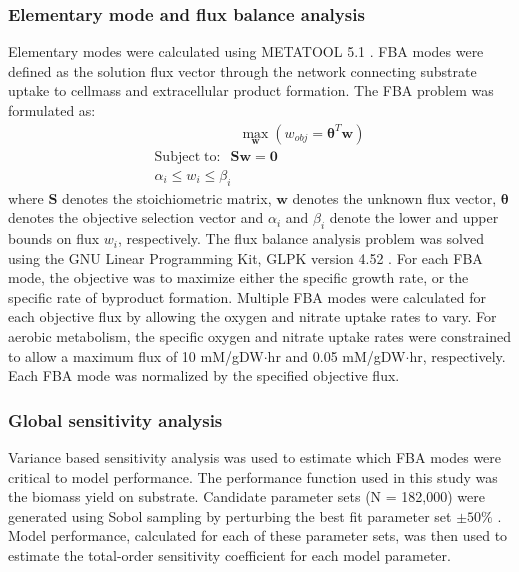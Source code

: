 \documentclass[10pt,twocolumn,twoside,final]{IEEEtran}
\begin{document}
\noindent\subsubsection*{Elementary mode and flux balance analysis}
Elementary modes were calculated using METATOOL 5.1 \cite{2006_vonKamp_Metatool}.
FBA modes were defined as the solution flux vector through the network connecting substrate uptake to cellmass and extracellular product formation.
The FBA problem was formulated as:
\begin{equation}
 \begin{multlined}
	\qquad \qquad \qquad \max_{\boldsymbol{w}}{} \! \left( w_{obj} = \mathbf{\theta}^T \boldsymbol{w} \right) \\
	\mathrm{Subject \; to:}
	 \; \; \mathbf{S}\mathbf{w}=\mathbf{0} \\
\alpha_i \leq w_i \leq \beta_i  \qquad
 \end{multlined}
\end{equation}
where $\mathbf{S}$ denotes the stoichiometric matrix, $\mathbf{w}$ denotes the unknown flux vector, $\boldsymbol{\theta}$ denotes the objective selection vector
and $\alpha_i$ and $\beta_i$ denote the lower and upper bounds on flux $w_{i}$, respectively.
The flux balance analysis problem was solved using the GNU Linear Programming Kit, GLPK version 4.52 \cite{GLPK}.
For each FBA mode, the objective was to maximize either the specific growth rate, or the specific rate of byproduct formation.
Multiple FBA modes were calculated for each objective flux by allowing the oxygen and nitrate uptake rates to vary.
For aerobic metabolism, the specific oxygen and nitrate uptake rates were constrained to allow a maximum flux of 10 mM/gDW$\cdot$hr and 0.05 mM/gDW$\cdot$hr, respectively.
Each FBA mode was normalized by the specified objective flux.

\subsubsection*{Global sensitivity analysis}
Variance based sensitivity analysis was used to estimate which FBA modes were critical to model performance.
The performance function used in this study was the biomass yield on substrate.
Candidate parameter sets (N = 182,000) were generated using Sobol sampling by perturbing the best fit parameter set $\pm50\%$ \cite{SALib}.
Model performance, calculated for each of these parameter sets, was then used to estimate the total-order sensitivity coefficient for each model parameter.
\end{document}
